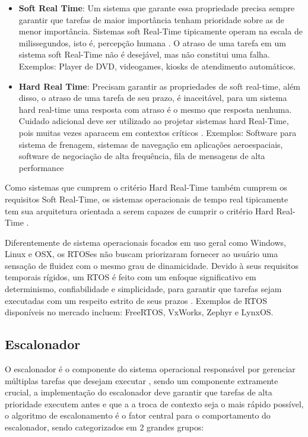 \begin{itemize}
    \item \textbf{Soft Real Time}: Um sistema que garante essa propriedade precisa sempre garantir que tarefas de  maior importância tenham prioridade sobre as de menor importância. Sistemas soft Real-Time tipicamente operam na escala de milissegundos, isto é, percepção humana \cite{SchedAndOptOfDistributedFT}. O atraso de uma tarefa em um sistema soft Real-Time não é desejável, mas não constitui uma falha. Exemplos: Player de DVD, videogames, kiosks de atendimento automáticos.
    
    \item \textbf{Hard Real Time}: Precisam garantir as propriedades de soft real-time, além disso, o atraso de uma tarefa de seu prazo, é inaceitável, para um sistema hard real-time uma resposta com atraso é o mesmo que resposta nenhuma. Cuidado adicional deve ser utilizado ao projetar sistemas hard Real-Time, pois muitas vezes aparacem em contextos críticos \cite{ModernOperatingSystems}. Exemplos: Software para sistema de frenagem, sistemas de navegação em aplicações aeroespaciais, software de negociação de alta frequência, fila de mensagens de alta performance
\end{itemize}

Como sistemas que cumprem o critério Hard Real-Time também cumprem os requisitos Soft Real-Time, os sistemas operacionais de tempo real tipicamente tem sua arquitetura orientada a serem capazes de cumprir o critério Hard Real-Time \cite{SchedAndOptOfDistributedFT}.

Diferentemente de sistema operacionais focados em uso geral como Windows, Linux e OSX, os RTOSes não buscam priorizaram fornecer ao usuário uma sensação de fluidez com o mesmo grau de dinamicidade. Devido à seus requisitos temporais rígidos, um RTOS é feito com um enfoque significativo em determinismo, confiabilidade e simplicidade, para garantir que tarefas sejam executadas com um respeito estrito de seus prazos \cite{OperatingSystemConcepts}. Exemplos de RTOS disponíveis no mercado incluem: FreeRTOS, VxWorks, Zephyr e LynxOS.

\subsection{Escalonador}

O escalonador é o componente do sistema operacional responsável por gerenciar múltiplas tarefas que desejam executar \cite{OperatingSystemConcepts}, sendo um componente extramente crucial, a implementação do escalonador deve garantir que tarefas de alta prioridade executem antes e que a a troca de contexto seja o mais rápido possível, o algoritmo de escalonamento é o fator central para o comportamento do escalonador, sendo categorizados em 2 grandes grupos:

